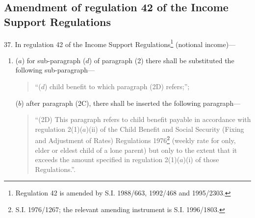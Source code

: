 \documentclass[12pt,a4paper]{article}
\begin{document}
%
%

\subsection[37. Amendment of regulation 42 of the Income Support Regulations]{Amendment of regulation 42 of the Income Support Regulations}

37.  In regulation 42 of the Income Support Regulations\footnote{\frenchspacing Regulation 42 is amended by S.I. 1988/663, 1992/468 and 1995/2303.} (notional income)—
\begin{enumerate}\item[]
($a$) for sub-paragraph ($d$) of paragraph (2) there shall be substituted the following sub-paragraph—
\begin{quotation}
“($d$) child benefit to which paragraph (2D) refers;”;
\end{quotation}

($b$) after paragraph (2C), there shall be inserted the following paragraph—
\begin{quotation}
“(2D) This paragraph refers to child benefit payable in accordance with regulation 2(1)($a$)(ii) of the Child Benefit and Social Security (Fixing and Adjustment of Rates) Regulations 1976\footnote{\frenchspacing S.I. 1976/1267; the relevant amending instrument is S.I. 1996/1803.} (weekly rate for only, elder or eldest child of a lone parent) but only to the extent that it exceeds the amount specified in regulation 2(1)($a$)(i) of those Regulations.”.
\end{quotation}
\end{enumerate}
\end{document}
